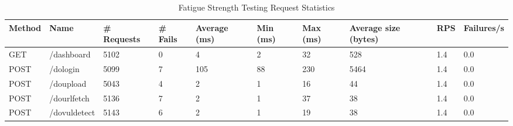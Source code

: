 \begin{table*}[h]
  \caption{Fatigue Strength Testing Request Statistics}
  \label{tab:fstreqstat}
  \begin{tabular}{|p{}|p{}|p{}|p{}|p{}|p{}|p{}|p{}|p{}|p{}|}
    \hline
    {\textbf{Method}} &  {\textbf{Name}} &  {\textbf{\# Requests}} &  {\textbf{\# Fails}} &  {\textbf{Average (ms)}} &  {\textbf{Min (ms)}} &  {\textbf{Max (ms)}} &  {\textbf{Average size (bytes)}} &  {\textbf{RPS}} &  {\textbf{Failures/s}} \\ \hline
    GET                                   & /dashboard                         & 5102                                      & 0                                      & 4                                          & 2                                      & 32                                     & 528                                                & 1.4                               & 0.0                                      \\ \hline
    POST                                  & /dologin                           & 5099                                      & 7                                      & 105                                        & 88                                     & 230                                    & 5464                                               & 1.4                               & 0.0                                      \\ \hline
    POST                                  & /doupload                          & 5043                                      & 4                                      & 2                                          & 1                                      & 16                                     & 44                                                 & 1.4                               & 0.0                                      \\ \hline
    POST                                  & /dourlfetch                        & 5136                                      & 7                                      & 2                                          & 1                                      & 37                                     & 38                                                 & 1.4                               & 0.0                                      \\ \hline
    POST                                  & /dovuldetect                       & 5143                                      & 6                                      & 2                                          & 1                                      & 19                                     & 38                                                 & 1.4                               & 0.0                                      \\ \hline

\end{tabular}
\end{table*}
